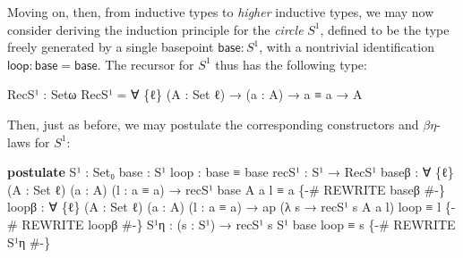 \documentclass[
  12pt]{article}
\newenvironment{Shaded}{\begin{snugshade}}{\end{snugshade}}
\newcommand{\DataTypeTok}[1]{\textcolor[rgb]{0.00,0.34,0.68}{#1}}
\newcommand{\KeywordTok}[1]{\textcolor[rgb]{0.12,0.11,0.11}{\textbf{#1}}}
\newcommand{\NormalTok}[1]{\textcolor[rgb]{0.12,0.11,0.11}{#1}}
\newcommand{\OtherTok}[1]{\textcolor[rgb]{0.00,0.43,0.16}{#1}}
\newcommand{\PreprocessorTok}[1]{\textcolor[rgb]{0.00,0.43,0.16}{#1}}
\begin{document}
Moving on, then, from inductive types to \emph{higher} inductive types,
we may now consider deriving the induction principle for the
\emph{circle} \(S^1\), defined to be the type freely generated by a
single basepoint \(\mathsf{base} : S^1\), with a nontrivial
identification \(\mathsf{loop} : \mathsf{base} = \mathsf{base}\). The
recursor for \(S^1\) thus has the following type:

\begin{Shaded}
\begin{Highlighting}[]
\NormalTok{RecS¹ }\OtherTok{:}\NormalTok{ Setω}
\NormalTok{RecS¹ }\OtherTok{=} \OtherTok{∀} \OtherTok{\{}\NormalTok{ℓ}\OtherTok{\}} \OtherTok{(}\NormalTok{A }\OtherTok{:} \DataTypeTok{Set}\NormalTok{ ℓ}\OtherTok{)} \OtherTok{→} \OtherTok{(}\NormalTok{a }\OtherTok{:}\NormalTok{ A}\OtherTok{)} \OtherTok{→}\NormalTok{ a ≡ a }\OtherTok{→}\NormalTok{ A}
\end{Highlighting}
\end{Shaded}

Then, just as before, we may postulate the corresponding constructors
and \(\beta\eta\)-laws for \(S^1\):

\begin{Shaded}
\begin{Highlighting}[]
\KeywordTok{postulate}
\NormalTok{    S¹ }\OtherTok{:} \DataTypeTok{Set₀}
\NormalTok{    base }\OtherTok{:}\NormalTok{ S¹}
\NormalTok{    loop }\OtherTok{:}\NormalTok{ base ≡ base}
\NormalTok{    recS¹ }\OtherTok{:}\NormalTok{ S¹ }\OtherTok{→}\NormalTok{ RecS¹}
\NormalTok{    baseβ }\OtherTok{:} \OtherTok{∀} \OtherTok{\{}\NormalTok{ℓ}\OtherTok{\}} \OtherTok{(}\NormalTok{A }\OtherTok{:} \DataTypeTok{Set}\NormalTok{ ℓ}\OtherTok{)} \OtherTok{(}\NormalTok{a }\OtherTok{:}\NormalTok{ A}\OtherTok{)} \OtherTok{(}\NormalTok{l }\OtherTok{:}\NormalTok{ a ≡ a}\OtherTok{)} \OtherTok{→}\NormalTok{ recS¹ base A a l ≡ a}
    \PreprocessorTok{\{{-}\# REWRITE baseβ \#{-}\}}
\NormalTok{    loopβ }\OtherTok{:} \OtherTok{∀} \OtherTok{\{}\NormalTok{ℓ}\OtherTok{\}} \OtherTok{(}\NormalTok{A }\OtherTok{:} \DataTypeTok{Set}\NormalTok{ ℓ}\OtherTok{)} \OtherTok{(}\NormalTok{a }\OtherTok{:}\NormalTok{ A}\OtherTok{)} \OtherTok{(}\NormalTok{l }\OtherTok{:}\NormalTok{ a ≡ a}\OtherTok{)}
              \OtherTok{→}\NormalTok{ ap }\OtherTok{(λ}\NormalTok{ s }\OtherTok{→}\NormalTok{ recS¹ s A a l}\OtherTok{)}\NormalTok{ loop ≡ l}
    \PreprocessorTok{\{{-}\# REWRITE loopβ \#{-}\}}
\NormalTok{    S¹η }\OtherTok{:} \OtherTok{(}\NormalTok{s }\OtherTok{:}\NormalTok{ S¹}\OtherTok{)} \OtherTok{→}\NormalTok{ recS¹ s S¹ base loop ≡ s}
    \PreprocessorTok{\{{-}\# REWRITE S¹η \#{-}\}}
\end{Highlighting}
\end{Shaded}
\end{document}
